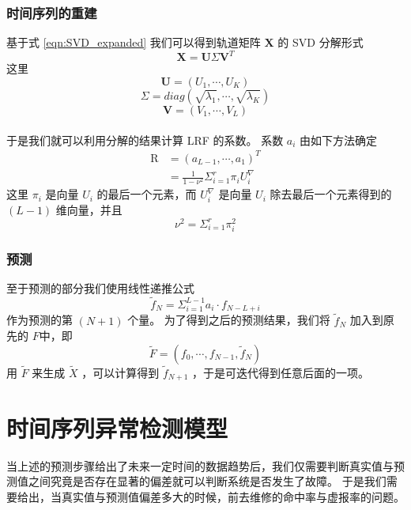 \documentclass[a4paper]{article}
\begin{document}
\section{时间序列的重建}
基于式 \ref{eqn:SVD_expanded} 我们可以得到轨道矩阵 $\textbf{X}$ 的 SVD 分解形式
\begin{equation}
	\label{eqn:SVD}
	\textbf{X} = \textbf{U} \Sigma \textbf{V}^T
\end{equation}
这里
\begin{equation}
	\label{eqn:SVD_U}
	\textbf{U} = (U_1, \cdots, U_K)
\end{equation}
\begin{equation}
	\label{eqn:SVD_Sigma}
	\Sigma = diag(\sqrt{\lambda_1}, \cdots, \sqrt{\lambda_K})
\end{equation}
\begin{equation}
	\label{eqn:SVD_V} 
	\textbf{V} = (V_1, \cdots, V_L)
\end{equation}
\\
\indent 于是我们就可以利用分解的结果计算 LRF 的系数。
系数 $a_i$ 由如下方法确定
\begin{align}
	\textrm{R} &= (a_{L-1}, \cdots, a_1)^T \\
	           &= \frac{1}{1-\nu^2} \Sigma_{i=1}^r \pi_i U_i^\nabla \label{eqn:R_a}
\end{align}
这里 $\pi_i$ 是向量 $U_i$ 的最后一个元素，而 $U_i^\nabla$ 是向量 $U_i$ 除去最后一个元素得到的 $(L-1)$ 维向量，并且
\begin{equation}
	\label{eqn:ssa_nu^2}
	\nu^2 = \Sigma_{i=1}^r \pi_i^2
\end{equation}

\section{预测}
至于预测的部分我们使用线性递推公式
\begin{equation}
	\label{eqn:ssa_prediction}
	\tilde{f}_N = \Sigma_{i=1}^{L-1} a_i \cdot f_{N-L+i} 
\end{equation}
作为预测的第 $(N+1)$ 个量。
为了得到之后的预测结果，我们将 $\tilde{f}_N$ 加入到原先的 $F$中，即
\begin{equation}
	\label{eqn:ssa_new_f}
	\tilde{F} = (f_0, \cdots, f_{N-1}, \tilde{f}_N)
\end{equation}
用 $\tilde{F}$ 来生成 $\tilde{X}$ ，可以计算得到 $\tilde{f}_{N+1}$ ，于是可迭代得到任意后面的一项。

\part{时间序列异常检测模型}
当上述的预测步骤给出了未来一定时间的数据趋势后，我们仅需要判断真实值与预测值之间究竟是否存在显著的偏差就可以判断系统是否发生了故障。
于是我们需要给出，当真实值与预测值偏差多大的时候，前去维修的命中率与虚报率的问题。
\end{document}
